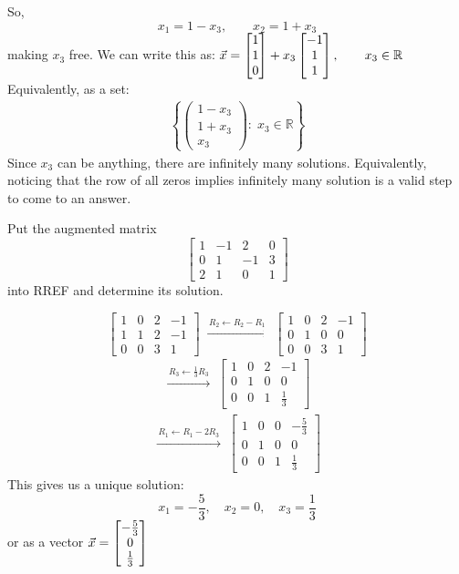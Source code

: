 \begin{Answer}[ref=infinitelymany]
So, 
$$x_1 = 1 - x_3,\qquad x_2 = 1 + x_3$$
making $x_3$ free.
We can write this as:
$\vec{x}
=
\begin{bmatrix} 
1\\1\\0
 \end{bmatrix}
+
x_3
\begin{bmatrix} 
-1\\1\\1
 \end{bmatrix},
\qquad x_3\in\mathbb{R}$
Equivalently, as a set:
$$\begin{array}{c} \left\{
\begin{pmatrix}
1-x_3\\
1+x_3\\
x_3
\end{pmatrix}
:\; x_3\in\mathbb{R}
\right\} \end{array}$$
Since $x_3$ can be anything, there are infinitely many solutions. Equivalently, noticing that the row of all zeros implies infinitely many solution is a valid step to come to an answer.
\end{Answer}
\begin{Exercise}[title=Augmented Matrices 2, label=uniquesol]
Put the augmented matrix
$$\begin{bmatrix}
1&-1&2&0\\
0&1&-1&3\\
2&1&0&1
\end{bmatrix}$$
into RREF and determine its solution.
\end{Exercise}
\begin{Answer}[ref=uniquesol]
$$\begin{bmatrix}
1&0&2&-1\\
1&1&2&-1\\
0&0&3&1
\end{bmatrix}
\;\xrightarrow{\,R_2\leftarrow R_2-R_1\,}\;
\begin{bmatrix}
1&0&2&-1\\
0&1&0&0\\
0&0&3&1
\end{bmatrix}$$
$$\begin{array}{c} \xrightarrow{\,R_3\leftarrow \frac13 R_3\,}\;
\begin{bmatrix}
1&0&2&-1\\
0&1&0&0\\
0&0&1&\frac13
\end{bmatrix} \end{array}$$
$$\begin{array}{c} \xrightarrow{\,R_1\leftarrow R_1-2R_3\,}\;
\boxed{
\begin{bmatrix}
1&0&0&-\frac53\\
0&1&0&0\\
0&0&1&\frac13
\end{bmatrix}} \end{array}$$
This gives us a unique solution:
$$x_1=-\frac53,\quad x_2=0,\quad x_3=\frac13$$
or as a vector
\(
\vec{x} = \begin{bmatrix} -\frac53\\0\\\frac13 \end{bmatrix}
\)
\end{Answer}

